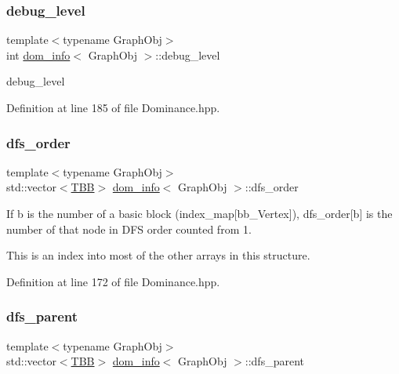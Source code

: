 \subsubsection{\texorpdfstring{debug\+\_\+level}{debug\_level}}
{\footnotesize\ttfamily template$<$typename Graph\+Obj$>$ \\
int \hyperlink{classdom__info}{dom\+\_\+info}$<$ Graph\+Obj $>$\+::debug\+\_\+level\hspace{0.3cm}{\ttfamily [private]}}



debug\+\_\+level 



Definition at line 185 of file Dominance.\+hpp.

\mbox{\label{classdom__info_a50d93a521711056391d2faef621c3e86}} 
\subsubsection{\texorpdfstring{dfs\+\_\+order}{dfs\_order}}
{\footnotesize\ttfamily template$<$typename Graph\+Obj$>$ \\
std\+::vector$<$\hyperlink{Dominance_8hpp_ac35ffd4ddeccae8225d6ec6f55d65a97}{T\+BB}$>$ \hyperlink{classdom__info}{dom\+\_\+info}$<$ Graph\+Obj $>$\+::dfs\+\_\+order\hspace{0.3cm}{\ttfamily [private]}}



If b is the number of a basic block (index\+\_\+map\mbox{[}bb\+\_\+\+Vertex\mbox{]}), dfs\+\_\+order\mbox{[}b\mbox{]} is the number of that node in D\+FS order counted from 1. 

This is an index into most of the other arrays in this structure. 

Definition at line 172 of file Dominance.\+hpp.

\mbox{\label{classdom__info_ac70e44625882df4c67ae0066e9122679}} 
\subsubsection{\texorpdfstring{dfs\+\_\+parent}{dfs\_parent}}
{\footnotesize\ttfamily template$<$typename Graph\+Obj$>$ \\
std\+::vector$<$\hyperlink{Dominance_8hpp_ac35ffd4ddeccae8225d6ec6f55d65a97}{T\+BB}$>$ \hyperlink{classdom__info}{dom\+\_\+info}$<$ Graph\+Obj $>$\+::dfs\+\_\+parent\hspace{0.3cm}{\ttfamily [private]}}



